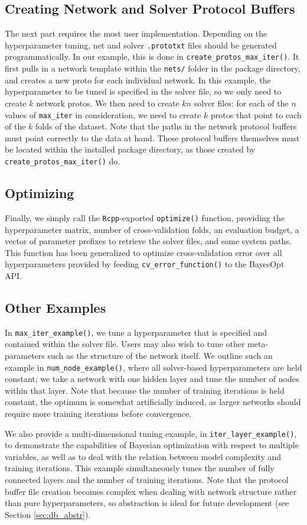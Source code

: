 \documentclass[master]{subfiles}
\begin{document}
\subsection{Creating Network and Solver Protocol Buffers}
The next part requires the most user implementation.  Depending on the hyperparameter tuning, net and solver \lstinline{.prototxt} files should be generated programmatically.  In our example, this is done in \lstinline{create_protos_max_iter()}.  It first pulls in a network template within the \lstinline{nets/} folder in the package directory, and creates a new proto for each individual network.  In this example, the hyperparameter to be tuned is specified in the solver file, so we only need to create $k$ network protos.  We then need to create $kn$ solver files: for each of the $n$ values of \lstinline{max_iter} in consideration, we need to create $k$ protos that point to each of the $k$ folds of the dataset.  Note that the paths in the network protocol buffers must point correctly to the data at hand.  These protocol buffers themselves must be located within the installed package directory, as those created by \lstinline{create_protos_max_iter()} do.
\subsection{Optimizing}
Finally, we simply call the \lstinline{Rcpp}-exported \lstinline{optimize()} function, providing the hyperparameter matrix, number of cross-validation folds, an evaluation budget, a vector of parameter prefixes to retrieve the solver files, and some system paths.  This function has been generalized to optimize cross-validation error over all hyperparameters provided by feeding \lstinline{cv_error_function()} to the BayesOpt API.
\subsection{Other Examples}
In \lstinline{max_iter_example()}, we tune a hyperparameter that is specified and contained within the solver file.  Users may also wish to tune other meta-parameters such as the structure of the network itself.  We outline such an example in \lstinline{num_node_example()}, where all solver-based hyperparameters are held constant; we take a network with one hidden layer and tune the number of nodes within that layer.  Note that because the number of training iterations is held constant, the optimum is somewhat artificially induced, as larger networks should require more training iterations before convergence.\par
We also provide a multi-dimensional tuning example, in \lstinline{iter_layer_example()}, to demonstrate the capabilities of Bayesian optimization with respect to multiple variables, as well as to deal with the relation between model complexity and training iterations.  This example simultaneously tunes the number of fully connected layers and the number of training iterations.  Note that the protocol buffer file creation becomes complex when dealing with network structure rather than pure hyperparameters, so abstraction is ideal for future development (see Section \ref{sec:db_abstr}).
\end{document}
